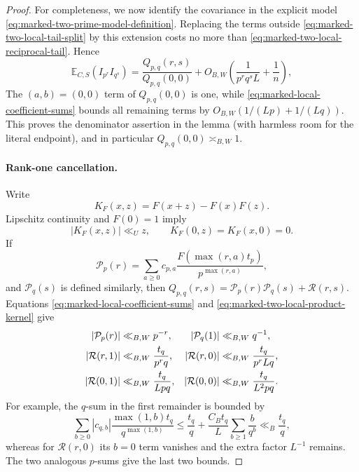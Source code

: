 \documentclass[11pt]{article}
\numberwithin{equation}{section}
\theoremstyle{definition}
\theoremstyle{remark}
\newcommand{\1}{\mathbf 1}
\begin{document}
\begin{proof}
For completeness, we now identify the covariance in the explicit model
\eqref{eq:marked-two-prime-model-definition}.
Replacing the terms outside \eqref{eq:marked-two-local-tail-split} by
this extension costs no more than
\eqref{eq:marked-two-local-reciprocal-tail}.  Hence
\begin{equation}
 {\mathbb E}_{C,S}(I_{p^r}I_{q^s})
 =\frac{Q_{p,q}(r,s)}{Q_{p,q}(0,0)}
 +O_{B,W}\!\left(\frac1{p^rq^sL}+\frac1n\right),
 \label{eq:marked-two-local-model-approximation}
\end{equation}
The \((a,b)=(0,0)\) term of \(Q_{p,q}(0,0)\) is one, while
\eqref{eq:marked-local-coefficient-sums} bounds all remaining terms by
\(O_{B,W}(1/(Lp)+1/(Lq))\).  This proves the denominator assertion in
the lemma (with harmless room for the literal endpoint), and in
particular \(Q_{p,q}(0,0)\asymp_{B,W}1\).

\paragraph{Rank-one cancellation.}
Write
\[
 K_F(x,z)=F(x+z)-F(x)F(z).
\]
Lipschitz continuity and \(F(0)=1\) imply
\begin{equation}
 |K_F(x,z)|\ll_U z,\qquad K_F(0,z)=K_F(x,0)=0.
 \label{eq:marked-two-local-product-kernel}
\end{equation}
If
\[
 \mathcal P_p(r)=\sum_{a\ge0}c_{p,a}
       \frac{F(\max(r,a)t_p)}{p^{\max(r,a)}},
\]
and \(\mathcal P_q(s)\) is defined similarly, then
\(Q_{p,q}(r,s)=\mathcal P_p(r)\mathcal P_q(s)+\mathcal R(r,s)\).
Equations \eqref{eq:marked-local-coefficient-sums} and
\eqref{eq:marked-two-local-product-kernel} give
\begin{align}
 |\mathcal P_p(r)|&\ll_{B,W}p^{-r},
 &|\mathcal P_q(1)|&\ll_{B,W}q^{-1},\notag\\
 |\mathcal R(r,1)|&\ll_{B,W}\frac{t_q}{p^rq},
 &|\mathcal R(r,0)|&\ll_{B,W}\frac{t_q}{p^rLq},\notag\\
 |\mathcal R(0,1)|&\ll_{B,W}\frac{t_q}{Lpq},
 &|\mathcal R(0,0)|&\ll_{B,W}\frac{t_q}{L^2pq}.
 \label{eq:marked-two-local-remainder-bounds}
\end{align}
For example, the \(q\)-sum in the first remainder is bounded by
\[
 \sum_{b\ge0}|c_{q,b}|
       \frac{\max(1,b)t_q}{q^{\max(1,b)}}
 \le\frac{t_q}{q}
   +\frac{C_Bt_q}{L}\sum_{b\ge1}\frac b{q^b}
 \ll_B\frac{t_q}{q},
\]
whereas for \(\mathcal R(r,0)\) its \(b=0\) term vanishes and the
extra factor \(L^{-1}\) remains.  The two analogous \(p\)-sums give
the last two bounds.


\end{proof}
\end{document}

